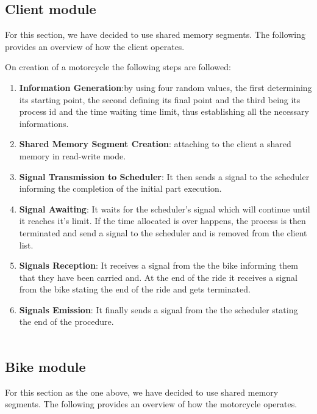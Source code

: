 \subsection{Client module}
For this section, we have decided to use shared memory segments. The following provides an overview of how the client operates. 

On creation of a motorcycle the following steps are followed:
\begin{enumerate}
  \item \textbf{Information Generation}:by using four random values, the first determining its starting point, the second defining its final point and the third being its process id and the time waiting time limit, thus establishing all the necessary informations.
  \item \textbf{Shared Memory Segment Creation}: attaching to the client a shared memory in read-write mode.
  \item \textbf{Signal Transmission to Scheduler}: It then sends a signal to the scheduler informing the completion of the initial part execution.
  \item \textbf{Signal Awaiting}: It waits for the scheduler's signal which will continue until it reaches it's limit. If the time allocated is over happens, the process is then terminated and send a signal to the scheduler and is removed from the  client list.
  \item \textbf{Signals Reception}: It receives a signal from the the bike informing them that they have been carried and. At the end of the ride it receives a signal from the bike stating the end of the ride and gets terminated.
\item \textbf{Signals Emission}: It finally sends a signal from the the scheduler stating the end of the procedure.\\\\
\end{enumerate}


\subsection{Bike module}
For this section as the one above, we have decided to use shared memory segments. The following provides an overview of how the motorcycle operates. 

